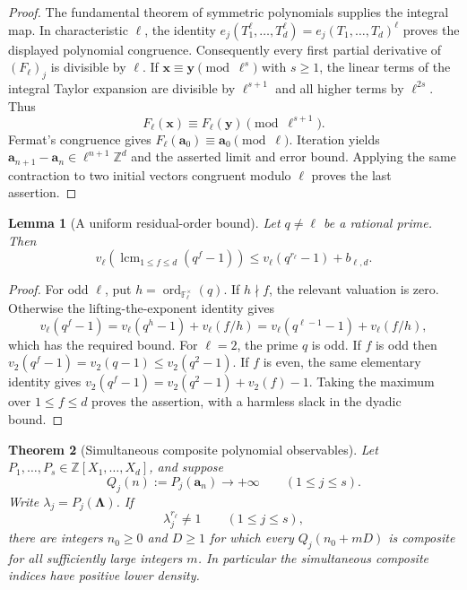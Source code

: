 \documentclass[11pt,a4paper]{article}
\newtheorem{theorem}{Theorem}[section]
\newtheorem{lemma}[theorem]{Lemma}
\theoremstyle{definition}\newtheorem{definition}[theorem]{Definition}
\theoremstyle{remark}\newtheorem{remark}[theorem]{Remark}
\begin{document}
\begin{proof}
The fundamental theorem of symmetric polynomials supplies the
integral map.  In characteristic $\ell$, the identity
$e_j(T_1^\ell,\ldots,T_d^\ell)=e_j(T_1,\ldots,T_d)^\ell$
proves the displayed polynomial congruence.  Consequently every
first partial derivative of $(F_\ell)_j$ is divisible by $\ell$.
If $\boldsymbol x\equiv\boldsymbol y\pmod{\ell^s}$ with $s\ge1$,
the linear terms of the integral Taylor expansion are divisible
by $\ell^{s+1}$ and all higher terms by $\ell^{2s}$.  Thus
\[
 F_\ell(\boldsymbol x)\equiv F_\ell(\boldsymbol y)
          \pmod{\ell^{s+1}}.
\]
Fermat's congruence gives $F_\ell(\boldsymbol a_0)\equiv
\boldsymbol a_0\pmod\ell$.  Iteration yields
$\boldsymbol a_{n+1}-\boldsymbol a_n\in
\ell^{n+1}\mathbb Z^d$ and the asserted limit and error bound.
Applying the same contraction to two initial vectors congruent
modulo $\ell$ proves the last assertion.
\end{proof}

\begin{lemma}[A uniform residual-order bound]
\label{newclock:budget}
Let $q\ne\ell$ be a rational prime.  Then
\[
 v_\ell\!\left(\operatorname{lcm}_{1\le f\le d}(q^f-1)\right)
 \le v_\ell(q^{r_\ell}-1)+b_{\ell,d}.
\]
\end{lemma}
\begin{proof}
For odd $\ell$, put $h=\operatorname{ord}_{\mathbb F_\ell^\times}(q)$.
If $h\nmid f$, the relevant valuation is zero.  Otherwise the
lifting-the-exponent identity gives
\[
 v_\ell(q^f-1)=v_\ell(q^h-1)+v_\ell(f/h)
              =v_\ell(q^{\ell-1}-1)+v_\ell(f/h),
\]
which has the required bound.  For $\ell=2$, the prime $q$ is
odd.  If $f$ is odd then $v_2(q^f-1)=v_2(q-1)\le v_2(q^2-1)$.
If $f$ is even, the same elementary identity gives
$v_2(q^f-1)=v_2(q^2-1)+v_2(f)-1$.  Taking the maximum over
$1\le f\le d$ proves the assertion, with a harmless slack in
the dyadic bound.
\end{proof}

\begin{theorem}[Simultaneous composite polynomial observables]
\label{newclock:polynomial}
Let $P_1,\ldots,P_s\in\mathbb Z[X_1,\ldots,X_d]$, and suppose
\[
 Q_j(n):=P_j(\boldsymbol a_n)\longrightarrow+\infty
       \qquad(1\le j\le s).
\]
Write $\lambda_j=P_j(\boldsymbol\Lambda)$.  If
\[
 \lambda_j^{r_\ell}\ne1\qquad(1\le j\le s),
\]
there are integers $n_0\ge0$ and $D\ge1$ for which every
$Q_j(n_0+mD)$ is composite for all sufficiently large integers
$m$.  In particular the simultaneous composite indices have
positive lower density.
\end{theorem}
\end{document}
